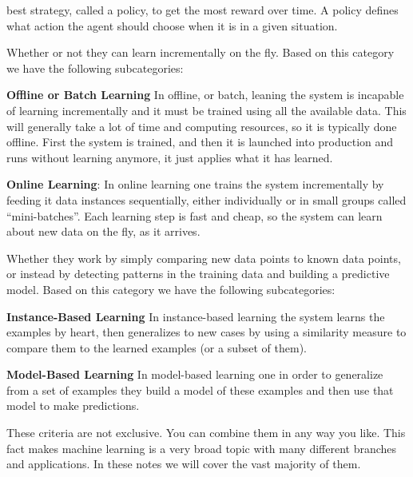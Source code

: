 best strategy, called a policy, to get the most reward over time. A policy defines what action the agent should
choose when it is in a given situation.
\eit
\item Whether or not they can learn incrementally on the fly. Based on this category we have the following
subcategories:
\bit
\item \textbf{Offline or Batch Learning} In offline, or batch, leaning the system is incapable of learning
incrementally and it must be trained using all the available data. This will generally take a lot of time and
computing resources, so it is typically done offline. First the system is trained, and then it is launched into
production and runs without learning anymore, it just applies what it has learned.
\item \textbf{Online Learning}: In online learning one trains the system incrementally by feeding it data instances
sequentially, either individually or in small groups called ``mini-batches''. Each learning step is fast and cheap, so
the system can learn about new data on the fly, as it arrives.
\eit
\item Whether they work by simply comparing new data points to known data
points, or instead by detecting patterns in the training data and building a predictive model. Based on this
category we have the following subcategories:
\bit
\item \textbf{Instance-Based Learning} In instance-based learning the system learns the examples by heart, then
generalizes to new cases by using a similarity measure to compare them to the learned examples (or a subset of them).
\item \textbf{Model-Based Learning} In model-based learning one in order to generalize from a set of examples they build
a model of these examples and then use that model to make predictions.
\eit
\een

These criteria are not exclusive. You can combine them in any way you like. This fact makes machine learning is a
very broad topic with many different branches and applications. In these notes we will cover the vast majority of them.